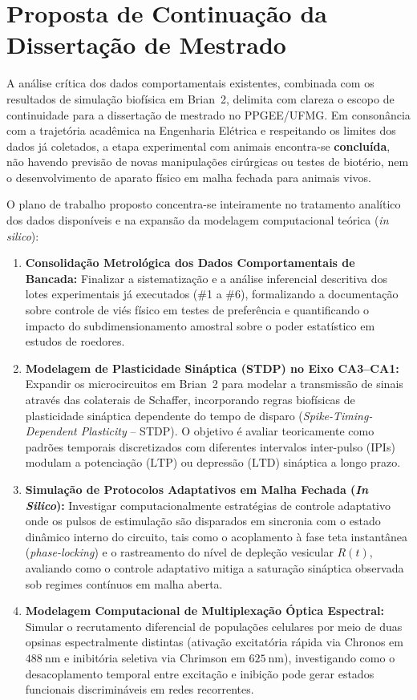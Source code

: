 \documentclass[11pt,a4paper,article,brazil]{abntex2}
\begin{document}
\section{Proposta de Continuação da Dissertação de Mestrado}

A análise crítica dos dados comportamentais existentes, combinada com os resultados de simulação biofísica em \textsf{Brian~2}, delimita com clareza o escopo de continuidade para a dissertação de mestrado no PPGEE/UFMG. Em consonância com a trajetória acadêmica na Engenharia Elétrica e respeitando os limites dos dados já coletados, a etapa experimental com animais encontra-se \textbf{concluída}, não havendo previsão de novas manipulações cirúrgicas ou testes de biotério, nem o desenvolvimento de aparato físico em malha fechada para animais vivos.

O plano de trabalho proposto concentra-se inteiramente no tratamento analítico dos dados disponíveis e na expansão da modelagem computacional teórica (\emph{in silico}):

\begin{enumerate}
    \item \textbf{Consolidação Metrológica dos Dados Comportamentais de Bancada:} Finalizar a sistematização e a análise inferencial descritiva dos lotes experimentais já executados (\#1 a \#6), formalizando a documentação sobre controle de viés físico em testes de preferência e quantificando o impacto do subdimensionamento amostral sobre o poder estatístico em estudos de roedores.
    \item \textbf{Modelagem de Plasticidade Sináptica (STDP) no Eixo CA3--CA1:} Expandir os microcircuitos em \textsf{Brian~2} para modelar a transmissão de sinais através das colaterais de Schaffer, incorporando regras biofísicas de plasticidade sináptica dependente do tempo de disparo (\emph{Spike-Timing-Dependent Plasticity} -- STDP). O objetivo é avaliar teoricamente como padrões temporais discretizados com diferentes intervalos inter-pulso (IPIs) modulam a potenciação ($\text{LTP}$) ou depressão ($\text{LTD}$) sináptica a longo prazo.
    \item \textbf{Simulação de Protocolos Adaptativos em Malha Fechada (\emph{In Silico}):} Investigar computacionalmente estratégias de controle adaptativo onde os pulsos de estimulação são disparados em sincronia com o estado dinâmico interno do circuito, tais como o acoplamento à fase teta instantânea (\emph{phase-locking}) e o rastreamento do nível de depleção vesicular $R(t)$, avaliando como o controle adaptativo mitiga a saturação sináptica observada sob regimes contínuos em malha aberta.
    \item \textbf{Modelagem Computacional de Multiplexação Óptica Espectral:} Simular o recrutamento diferencial de populações celulares por meio de duas opsinas espectralmente distintas (ativação excitatória rápida via Chronos em $\qty{488}{\nano\meter}$ e inibitória seletiva via Chrimson em $\qty{625}{\nano\meter}$), investigando como o desacoplamento temporal entre excitação e inibição pode gerar estados funcionais discrimináveis em redes recorrentes.
\end{enumerate}
\end{document}
